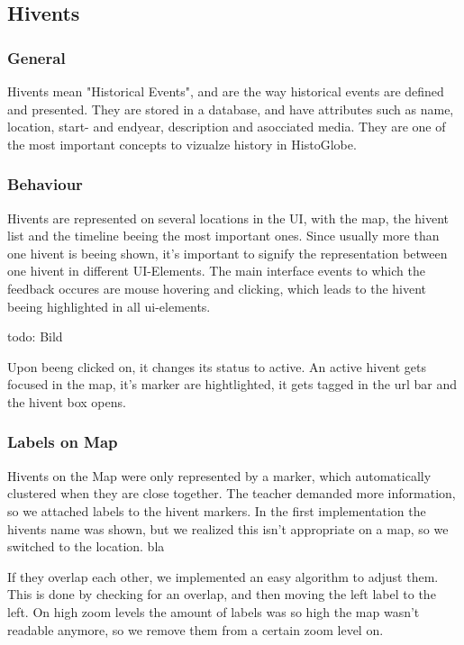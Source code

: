 \subsection{Hivents} %
\label{sec:hivents}
\subsubsection{General} %
\label{sub:general}
Hivents mean "Historical Events", and are the way historical events are defined and presented. They are stored in a database, and have attributes such as name, location, start- and endyear, description and asocciated media.
They are one of the most important concepts to vizualze history in HistoGlobe.

\subsubsection{Behaviour} %
\label{sub:behaviour}
Hivents are represented on several locations in the UI, with the map, the hivent list and the timeline beeing the most important ones.
Since usually more than one hivent is beeing shown, it's important to signify the representation between one hivent in different UI-Elements.
The main interface events to which the feedback occures are mouse hovering and clicking, which leads to the hivent beeing highlighted in all ui-elements.

todo: Bild

Upon beeng clicked on, it changes its status to active. An active hivent gets focused in the map, it's marker are hightlighted, it gets tagged in the url bar and the hivent box opens.

\subsubsection{Labels on Map}
Hivents on the Map were only represented by a marker, which automatically clustered when they are close together.
The teacher demanded more information, so we attached labels to the hivent markers.
In the first implementation the hivents name was shown, but we realized this isn't appropriate on a map, so we switched to the location.
bla

If they overlap each other, we implemented an easy algorithm to adjust them. 
This is done by checking for an overlap, and then moving the left label to the left.
On high zoom levels the amount of labels was so high the map wasn't readable anymore, so we remove them from a certain zoom level on.



